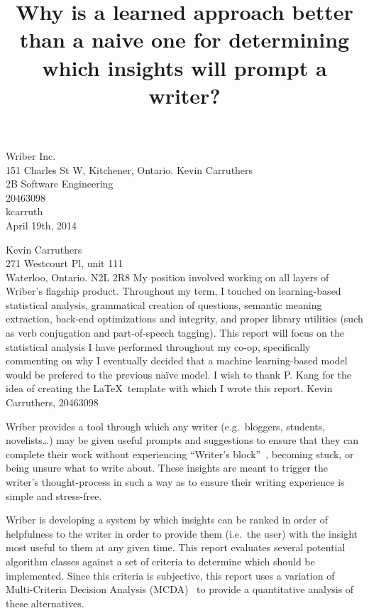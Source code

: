 \documentclass[12pt]{article}
\begin{document}
\title{Why is a learned approach better than a naive one for determining which insights will prompt a writer?}
{
	Wriber Inc.\\
	151 Charles St W, Kitchener, Ontario.
}
{
	Kevin Carruthers\\
	2B Software Engineering\\
	20463098\\
	kcarruth\\
	April 19th, 2014
}


{
	\noindent
	Kevin Carruthers\\
	271 Westcourt Pl, unit 111\\
	Waterloo, Ontario. N2L 2R8
}
{
	My position involved working on all layers of Wriber's flagship product. Throughout my term, I touched on learning-based statistical analysis, grammatical creation of questions, semantic meaning extraction, back-end optimizations and integrity, and proper library utilities (such as verb conjugation and part-of-speech tagging).
}
{
	This report will focus on the statistical analysis I have performed throughout my co-op, specifically commenting on why I eventually decided that a machine learning-based model would be prefered to the previous naïve model.
}
{
	I wish to thank P. Kang for the idea of creating the \LaTeX\ template with which I wrote this report.
}
{
	Kevin Carruthers, 20463098
}


Wriber provides a tool through which any writer (e.g.\ bloggers, students, novelists\dots) may be given useful prompts and suggestions to ensure that they can complete their work without experiencing ``Writer's block''~\cite{kamil}, becoming stuck, or being unsure what to write about. These insights are meant to trigger the writer's thought-process in such a way as to ensure their writing experience is simple and stress-free.

Wriber is developing a system by which insights can be ranked in order of helpfulness to the writer in order to provide them (i.e.\ the user) with the insight most useful to them at any given time. This report evaluates several potential algorithm classes against a set of criteria to determine which should be implemented. Since this criteria is subjective, this report uses a variation of Multi-Criteria Decision Analysis (MCDA)~\cite{mcda} to provide a quantitative analysis of these alternatives.
\end{document}
